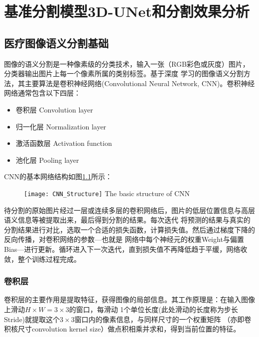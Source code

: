 
\chapter{基准分割模型3D-UNet和分割效果分析}\label{chap:baseline_model}

\section{医疗图像语义分割基础}

图像的语义分割是一种像素级的分类技术，输入一张（RGB彩色或灰度）图片，分类器输出图片上每一个像素所属的类别标签。基于深度
学习的图像语义分割方法，其主要算法是卷积神经网络(Convolutional Neural Network, CNN)。卷积神经网络通常包含以下四层：
\begin{itemize}
    \item 卷积层 Convolution layer
    \item 归一化层 Normalization layer
    \item 激活函数层 Activation function
    \item 池化层 Pooling layer
\end{itemize}
CNN的基本网络结构如图\ref{fig:CNN_basic_structure}所示：
\begin{figure}[!htp]
    \centering
    \texttt{[image: CNN\_Structure]}
        {The basic structure of CNN}
    \label{fig:CNN_basic_structure}
\end{figure}

\noindent{}待分割的原始图片经过一层或连续多层的卷积网络后，图片的低层位置信息与高层语义信息等被提取出来，最后得到分割的结果。每次迭代
将预测的结果与真实的分割结果进行对比，选取一个合适的损失函数，计算损失值。然后通过梯度下降的反向传播，对卷积网络的参数---也就是
网络中每个神经元的权重Weight与偏置Bias---进行更新。循环进入下一次迭代，直到损失值不再降低趋于平缓，网络收敛，整个训练过程完成。

\subsection{卷积层}
卷积层的主要作用是提取特征，获得图像的局部信息。其工作原理是：在输入图像上滑动$H \times W = 3 \times 3$的窗口，每滑动
1个单位长度(此处滑动的长度称为步长Stride)就提取这个$3 \times 3$窗口内的像素信息，与同样尺寸的一个权重矩阵
（亦即卷积核尺寸convolution kernel size）做点积相乘并求和，得到当前位置的特征。

